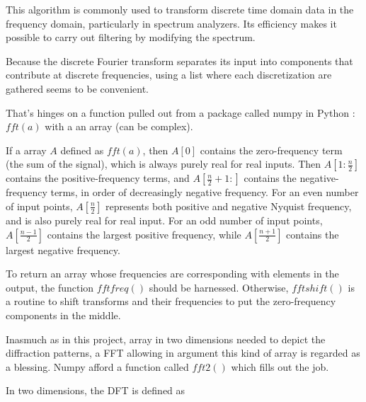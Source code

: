 \documentclass[10pt,a4paper]{article}
\begin{document}
This algorithm is commonly used to transform discrete time domain data in the frequency domain, particularly in spectrum analyzers. Its efficiency makes it possible to carry out filtering by modifying the spectrum.  

Because the discrete Fourier transform separates its input into components that contribute at discrete frequencies, using a list where each discretization are gathered seems to be convenient. 

That's hinges on a function pulled out from a package called numpy in Python : $fft(a)$ with a an array (can be complex). 

If a array $A$ defined as $fft(a)$, then $A[0]$ contains the zero-frequency term (the sum of the signal), which is always purely real for real inputs. Then $A\left[1:\frac{n}{2}\right]$ contains the positive-frequency terms, and $A\left[\frac{n}{2}+1:\right]$ contains the negative-frequency terms, in order of decreasingly negative frequency. For an even number of input points, $A\left[\frac{n}{2}\right]$ represents both positive and negative Nyquist frequency, and is also purely real for real input. For an odd number of input points, $A\left[\frac{n-1}{2}\right]$ contains the largest positive frequency, while $A\left[\frac{n+1}{2}\right]$ contains the largest negative frequency. 

To return an array whose frequencies are corresponding with elements in the output, the function $fftfreq()$ should be harnessed. Otherwise, $fftshift()$ is a routine to shift transforms and their frequencies to put the zero-frequency components in the middle. 

Inasmuch as in this project, array in two dimensions needed to depict the diffraction patterns, a FFT allowing in argument this kind of array is regarded as a blessing. Numpy afford a function called $fft2()$ which fills out the job.  

In two dimensions, the DFT is defined as 
\end{document}
